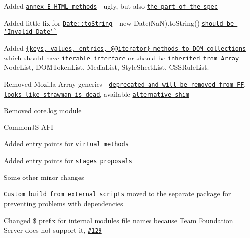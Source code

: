 \begin{DoxyItemize}
\item Added \href{https://github.com/zloirock/core-js#ecmascript-6-string}{\tt annex B H\+T\+ML methods} -\/ ugly, but also \href{http://www.ecma-international.org/ecma-262/6.0/#sec-string.prototype.anchor}{\tt the part of the spec}
\item Added little fix for \href{https://github.com/zloirock/core-js#ecmascript-6-date}{\tt {\ttfamily Date\+::to\+String}} -\/ {\ttfamily new Date(\+Na\+N).to\+String()} \href{http://www.ecma-international.org/ecma-262/6.0/#sec-todatestring}{\tt should be `\textquotesingle{}Invalid Date'\`{}}
\item Added \href{https://github.com/zloirock/core-js#iterable-dom-collections}{\tt {\ttfamily \{keys, values, entries, @@iterator\}} methods to D\+OM collections} which should have \href{https://heycam.github.io/webidl/#idl-iterable}{\tt iterable interface} or should be \href{https://heycam.github.io/webidl/#LegacyArrayClass}{\tt inherited from {\ttfamily Array}} -\/ {\ttfamily Node\+List}, {\ttfamily D\+O\+M\+Token\+List}, {\ttfamily Media\+List}, {\ttfamily Style\+Sheet\+List}, {\ttfamily C\+S\+S\+Rule\+List}.
\item Removed Mozilla {\ttfamily Array} generics -\/ \href{https://developer.mozilla.org/en-US/docs/Web/JavaScript/Reference/Global_Objects/Array#Array_generic_methods}{\tt deprecated and will be removed from FF}, \href{http://wiki.ecmascript.org/doku.php?id=strawman:array_statics}{\tt looks like strawman is dead}, available \href{https://github.com/plusdude/array-generics}{\tt alternative shim}
\item Removed {\ttfamily core.\+log} module
\item Common\+JS A\+PI
\begin{DoxyItemize}
\item Added entry points for \href{https://github.com/zloirock/core-js#commonjs-and-prototype-methods-without-global-namespace-pollution}{\tt virtual methods}
\item Added entry points for \href{https://github.com/zloirock/core-js#ecmascript-7-proposals}{\tt stages proposals}
\item Some other minor changes
\end{DoxyItemize}
\item \href{https://github.com/zloirock/core-js#custom-build-from-external-scripts}{\tt Custom build from external scripts} moved to the separate package for preventing problems with dependencies
\item Changed {\ttfamily \$} prefix for internal modules file names because Team Foundation Server does not support it, \href{https://github.com/zloirock/core-js/issues/129}{\tt \#129}

\end{DoxyItemize}
